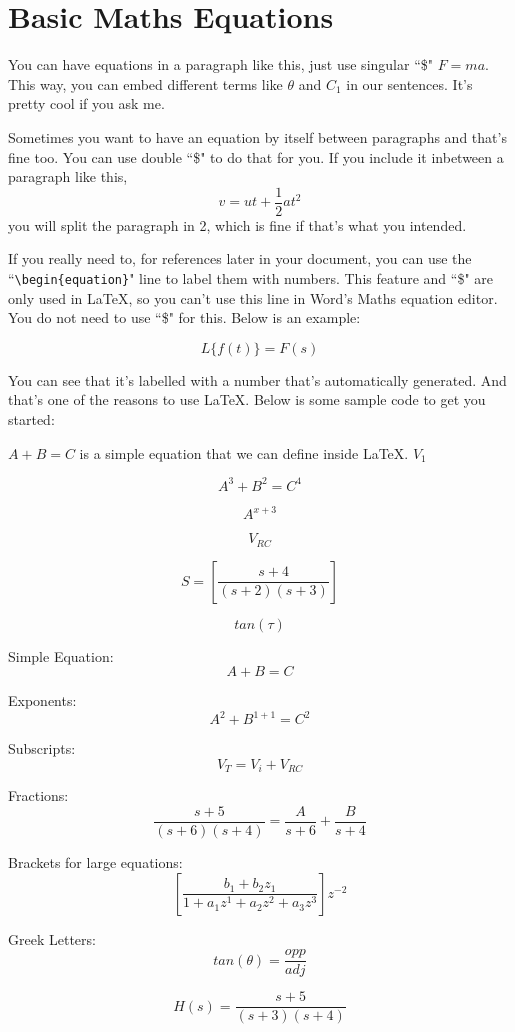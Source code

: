 \documentclass[12pt, a4paper]{article}
\begin{document}
	\section{Basic Maths Equations}
	
		You can have equations in a paragraph like this, just use singular ``\$" $F=ma$. This way, you can embed different terms like $\theta$ and $C_1$ in our sentences. It's pretty cool if you ask me.
	
		Sometimes you want to have an equation by itself between paragraphs and that's fine too. You can use double ``\$" to do that for you. If you include it inbetween a paragraph like this, $$v = ut + \frac{1}{2}at^2$$ you will split the paragraph in 2, which is fine if that's what you intended.

		If you really need to, for references later in your document, you can use the ``\texttt{\textbackslash begin\{equation\}}" line to label them with numbers. This feature and ``\$" are only used in \LaTeX , so you can't use this line in Word's Maths equation editor. You do not need to use ``\$" for this. Below is an example:
		
		\begin{equation}
			L\{f(t)\} = F(s)
		\end{equation}

		
		You can see that it's labelled with a number that's automatically generated. And that's one of the reasons to use \LaTeX . Below is some sample code to get you started:
		
		$A + B = C$ is a simple equation that we can define inside \LaTeX . $V_1$
		
		$$A^3 + B^2 = C^4$$
		
		$$A^{x+3}$$
		
		$$V_{RC}$$
		
		$$S = \left[\frac{s+4}{(s+2)(s+3)}\right]$$
		
		$$ tan(\tau)$$

		Simple Equation:
		$$A + B = C$$
		
		Exponents:
		$$A^2 + B^{1+1} = C^2$$
		
		Subscripts:
		$$V_T = V_i + V_{RC}$$
		
		Fractions:
		$$\frac{s+5}{(s+6)(s+4)} = \frac{A}{s+6} + \frac{B}{s+4}$$
		
		Brackets for large equations:
		$$\left[\frac{b_1 + b_2z_1}{1 + a_1z^1 +a_2z^2 + a_3z^3}\right]z^{-2}$$
		
		Greek Letters:
		$$tan(\theta) = \frac{opp}{adj}$$
		
		\begin{equation}
		H(s) = \frac{s+5}{(s+3)(s+4)}
		\end{equation}
		
\end{document}
